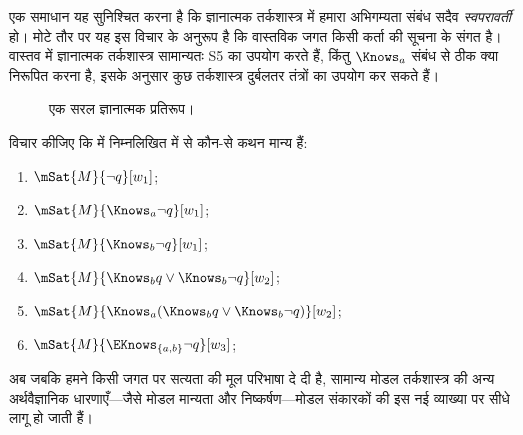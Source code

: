 \documentclass[../../../include/open-logic-section]{subfiles}
\begin{document}
एक समाधान यह सुनिश्चित करना है कि ज्ञानात्मक तर्कशास्त्र में हमारा
अभिगम्यता संबंध सदैव \emph{स्वपरावर्ती} हो। मोटे तौर पर यह इस विचार के
अनुरूप है कि वास्तविक जगत किसी कर्ता की सूचना के संगत है। वास्तव में
ज्ञानात्मक तर्कशास्त्र सामान्यतः S5 का उपयोग करते हैं, किंतु $\Knows_a$
संबंध से ठीक क्या निरूपित करना है, इसके अनुसार कुछ तर्कशास्त्र दुर्बलतर
तंत्रों का उपयोग कर सकते हैं।

\begin{figure}
  \begin{center}
  \end{center}
  \caption{एक सरल ज्ञानात्मक प्रतिरूप।}
\end{figure}

\begin{prob}
  विचार कीजिए कि  में निम्नलिखित में से
  कौन-से कथन मान्य हैं:
  \begin{enumerate}
    \item $\mSat{M}{\lnot q}[w_1]$;
    \item $\mSat{M}{\Knows_a \lnot q}[w_1]$;
    \item $\mSat{M}{\Knows_b \lnot q}[w_1]$;
    \item $\mSat{M}{\Knows_b q \lor \Knows_b \lnot q}[w_2]$;
    \item $\mSat{M}{\Knows_a( \Knows_b q \lor \Knows_b \lnot q)}[w_2]$;
    \item $\mSat{M}{\EKnows_{\{a,b\}} \lnot q}[w_3]$;
    \end{enumerate}
\end{prob}

अब जबकि हमने किसी जगत पर सत्यता की मूल परिभाषा दे दी है, सामान्य मोडल
तर्कशास्त्र की अन्य अर्थवैज्ञानिक धारणाएँ---जैसे मोडल मान्यता और
निष्कर्षण---मोडल संकारकों की इस नई व्याख्या पर सीधे लागू हो जाती हैं।
\end{document}
